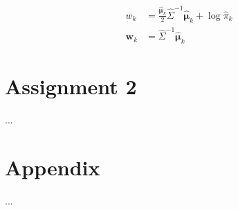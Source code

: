 \documentclass[a4paper, twocolumn]{article}
\begin{document}
        \begin{equation} \label{eq:weights}
        \begin{split}
            w_{k} &= \frac{\bm{\hat\mu}_k}{2}\hat\Sigma^{-1}\bm{\hat\mu}_k + \log\hat{\pi}_k \\
            \bm{w}_{k} &= \hat\Sigma^{-1}\bm{\hat\mu}_k
        \end{split}
        \end{equation}

    \section*{Assignment 2}

        ...

    \clearpage \nocite{*}
    
    

    \onecolumn \appendix
    \section*{Appendix}

        ...
\end{document}
